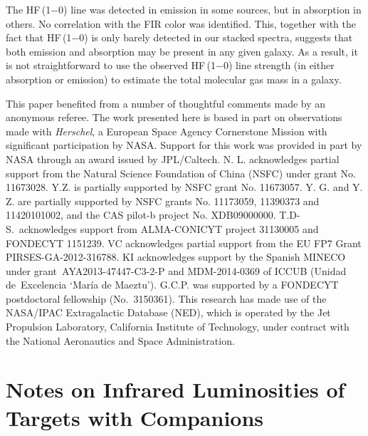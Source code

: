 \documentclass[preprint]{aastex}
\newcommand{\Herschel}{{\it Herschel}}
\begin{document}
The HF\,(1$-$0) line was detected in emission in some sources, but in 
absorption in others.  No correlation with the FIR color was identified. 
This, together with the fact that HF\,(1$-$0) is only barely detected 
in our stacked spectra, suggests that both emission and absorption
may be present in any given galaxy.  As a result, it is not straightforward
to use the observed HF\,(1$-$0) line strength (in either absorption or 
emission) to estimate the total molecular gas mass in a galaxy.



\acknowledgments

This paper benefited from a number of thoughtful comments made by an anonymous
referee. The work presented here 
is based in part on observations made with \Herschel, a European Space 
Agency Cornerstone Mission with significant participation by NASA.  Support for 
this work was provided in part by NASA through an award issued by JPL/Caltech.  
N. L. acknowledges partial support from the Natural Science 
Foundation of China (NSFC) under grant No. 11673028.  Y.Z. is partially 
supported by NSFC grant No. 11673057. Y. G. and Y. Z. are partially 
supported by NSFC grants No. 11173059, 11390373 and 11420101002, and the CAS pilot-b 
project No. XDB09000000. 
T.D-S.~acknowledges support from ALMA-CONICYT project 31130005 and FONDECYT 1151239.
VC acknowledges partial support from the EU FP7 Grant PIRSES-GA-2012-316788. 
KI acknowledges support by the Spanish MINECO under grant AYA2013-47447-C3-2-P 
and MDM-2014-0369 of ICCUB (Unidad de Excelencia `Mar\'ia de Maeztu').
G.C.P. was supported by a FONDECYT  postdoctoral fellowship (No.~3150361).
This research has made use of the NASA/IPAC Extragalactic Database (NED), 
which is operated by the Jet Propulsion Laboratory, California Institute
of Technology, under contract with the National Aeronautics and Space Administration.



\vspace{0.7in}
\appendix

\section{Notes on Infrared Luminosities of Targets with Companions}
\end{document}
